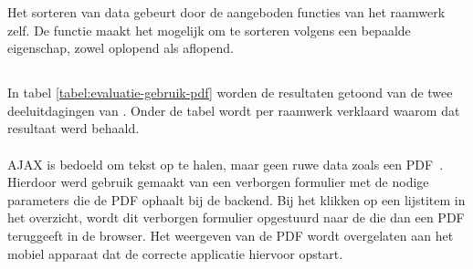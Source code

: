 Het sorteren van data gebeurt door de aangeboden functies van het raamwerk zelf.
De functie  maakt het mogelijk om te sorteren volgens een bepaalde eigenschap, zowel oplopend als aflopend.



\subsection{}
\label{sec:evaluatie-gebruik-pdf}

In tabel \ref{tabel:evaluatie-gebruik-pdf} worden de resultaten getoond van de twee deeluitdagingen van .
Onder de tabel wordt per raamwerk verklaard waarom dat resultaat werd behaald.

\begin{table}[H]
\centering
{}
\caption{Gebruik voor }
\label{tabel:evaluatie-gebruik-pdf}
\end{table}

\paragraph{\jqm}
AJAX is bedoeld om tekst op te halen, maar geen ruwe data zoals een PDF~\cite{Scott2009}. 
Hierdoor werd gebruik gemaakt van een verborgen formulier met de nodige parameters die de PDF ophaalt bij de backend. 
Bij het klikken op een lijstitem in het overzicht, wordt dit verborgen formulier opgestuurd naar de  die dan een PDF teruggeeft in de browser. 
Het weergeven van de PDF wordt overgelaten aan het mobiel apparaat dat de correcte applicatie hiervoor opstart.

